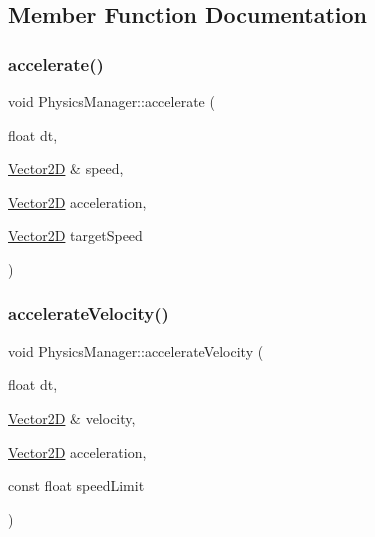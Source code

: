 \subsection{Member Function Documentation}
\hypertarget{class_physics_manager_ac91f12533b45cb7f7d66b82fbfd886fc}{}\label{class_physics_manager_ac91f12533b45cb7f7d66b82fbfd886fc} 
\subsubsection{\texorpdfstring{accelerate()}{accelerate()}}
{\footnotesize\ttfamily void Physics\+Manager\+::accelerate (\begin{DoxyParamCaption}\item[{float}]{dt,  }\item[{\hyperlink{class_vector2_d}{Vector2D} \&}]{speed,  }\item[{\hyperlink{class_vector2_d}{Vector2D}}]{acceleration,  }\item[{\hyperlink{class_vector2_d}{Vector2D}}]{target\+Speed }\end{DoxyParamCaption})\hspace{0.3cm}{\ttfamily [static]}}

\hypertarget{class_physics_manager_a74ec3035774192469d5e8560b80ddfd1}{}\label{class_physics_manager_a74ec3035774192469d5e8560b80ddfd1} 
\subsubsection{\texorpdfstring{accelerate\+Velocity()}{accelerateVelocity()}}
{\footnotesize\ttfamily void Physics\+Manager\+::accelerate\+Velocity (\begin{DoxyParamCaption}\item[{float}]{dt,  }\item[{\hyperlink{class_vector2_d}{Vector2D} \&}]{velocity,  }\item[{\hyperlink{class_vector2_d}{Vector2D}}]{acceleration,  }\item[{const float}]{speed\+Limit }\end{DoxyParamCaption})\hspace{0.3cm}{\ttfamily [static]}}

\hypertarget{class_physics_manager_ad97cf48ec9c49605c4ca1be653cd0806}{}\label{class_physics_manager_ad97cf48ec9c49605c4ca1be653cd0806} 
